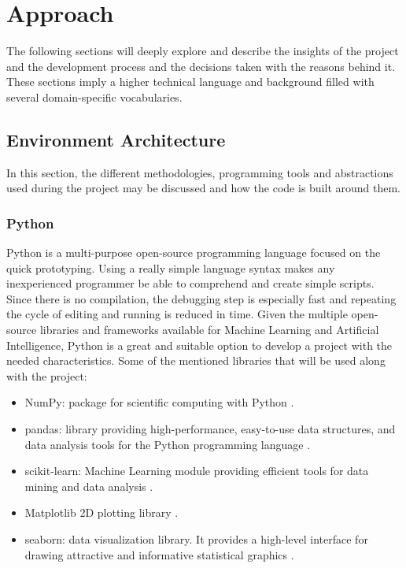 
\chapter{Approach}

\label{approach}
The following sections will deeply explore and describe the insights of the project and the development process and the decisions taken with the reasons behind it. 
These sections imply a higher technical language and background filled with several domain-specific vocabularies.


\section{Environment Architecture}
In this section, the different methodologies, programming tools and abstractions used during the project may be discussed and how the code is built around them.

\subsection{Python}
Python is a multi-purpose open-source programming language focused on the quick prototyping. Using a really simple language syntax makes any inexperienced programmer be able to comprehend and create simple scripts. 
Since there is no compilation, the debugging step is especially fast and repeating the cycle of editing and running is reduced in time\cite{pythonabout}.
Given the multiple open-source libraries and frameworks available for Machine Learning and Artificial Intelligence, Python is a great and suitable option to develop a project with the needed characteristics.
Some of the mentioned libraries that will be used along with the project:

\begin{itemize}
    \item NumPy: package for scientific computing with Python \cite{numpy}.
    \item pandas: library providing high-performance, easy-to-use data structures, and data analysis tools for the Python programming language \cite{pandas}.
    \item scikit-learn: Machine Learning module providing efficient tools for data mining and data analysis \cite{scikit}.
    \item Matplotlib  2D plotting library \cite{matplotlib}.
    \item seaborn: data visualization library. It provides a high-level interface for drawing attractive and informative statistical graphics \cite{seaborn}.
\end{itemize}


